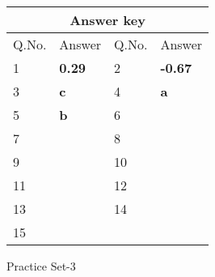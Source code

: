 \begin{table}[H]
	\centering
	\begin{tabular}{|p{1.5cm}|p{1.5cm}||p{1.5cm}|p{1.5cm}|}
		\hline
		\multicolumn{4}{|c|}{\textbf{Answer key}}\\\hline\hline
		\rowcolor{ocrel}Q.No.&Answer&Q.No.&Answer\\\hline
		1&\textbf{0.29} &2&\textbf{-0.67}\\\hline 
		3&\textbf{c} &4&\textbf{a} \\\hline
		5&\textbf{b} &6&\textbf{} \\\hline
		7&\textbf{}&8&\textbf{}\\\hline
		9&\textbf{}&10&\textbf{}\\\hline
		11&\textbf{} &12&\textbf{}\\\hline
		13&\textbf{}&14&\textbf{}\\\hline
		15&\textbf{}& &\\\hline
		
	\end{tabular}
\end{table}
\newpage
\begin{abox}
	Practice Set-3
\end{abox}
